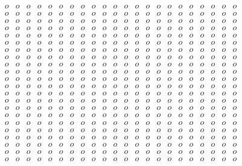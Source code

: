 $$\begin{array}{cccccccccccccccccccccc}
o & o & o & o & o & o & o & o & o & o & o & o & o & o & o & o & o & o & o & o & o & o \\
o & o & o & o & o & o & o & o & o & o & o & o & o & o & o & o & o & o & o & o & o & o \\
o & o & o & o & o & o & o & o & o & o & o & o & o & o & o & o & o & o & o & o & o & o \\
o & o & o & o & o & o & o & o & o & o & o & o & o & o & o & o & o & o & o & o & o & o \\
o & o & o & o & o & o & o & o & o & o & o & o & o & o & o & o & o & o & o & o & o & o \\
o & o & o & o & o & o & o & o & o & o & o & o & o & o & o & o & o & o & o & o & o & o \\
o & o & o & o & o & o & o & o & o & o & o & o & o & o & o & o & o & o & o & o & o & o \\
o & o & o & o & o & o & o & o & o & o & o & o & o & o & o & o & o & o & o & o & o & o \\
o & o & o & o & o & o & o & o & o & o & o & o & o & o & o & o & o & o & o & o & o & o \\
o & o & o & o & o & o & o & o & o & o & o & o & o & o & o & o & o & o & o & o & o & o \\
o & o & o & o & o & o & o & o & o & o & o & o & o & o & o & o & o & o & o & o & o & o \\
o & o & o & o & o & o & o & o & o & o & o & o & o & o & o & o & o & o & o & o & o & o \\
o & o & o & o & o & o & o & o & o & o & o & o & o & o & o & o & o & o & o & o & o & o \\
o & o & o & o & o & o & o & o & o & o & o & o & o & o & o & o & o & o & o & o & o & o \\
o & o & o & o & o & o & o & o & o & o & o & o & o & o & o & o & o & o & o & o & o & o \\
o & o & o & o & o & o & o & o & o & o & o & o & o & o & o & o & o & o & o & o & o & o \\
o & o & o & o & o & o & o & o & o & o & o & o & o & o & o & o & o & o & o & o & o & o \\
o & o & o & o & o & o & o & o & o & o & o & o & o & o & o & o & o & o & o & o & o & o \\
o & o & o & o & o & o & o & o & o & o & o & o & o & o & o & o & o & o & o & o & o & o \\
o & o & o & o & o & o & o & o & o & o & o & o & o & o & o & o & o & o & o & o & o & o \\
o & o & o & o & o & o & o & o & o & o & o & o & o & o & o & o & o & o & o & o & o & o \\
o & o & o & o & o & o & o & o & o & o & o & o & o & o & o & o & o & o & o & o & o & o \\
\end{array}$$


